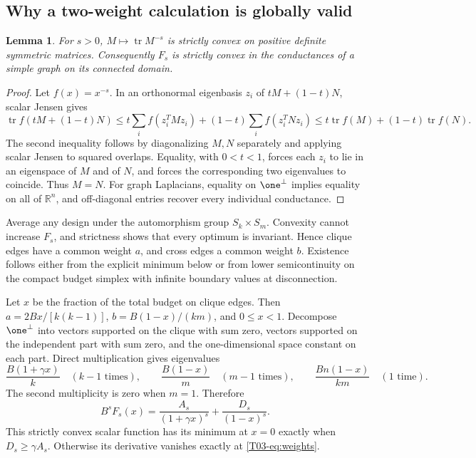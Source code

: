 \documentclass[11pt,a4paper]{article}
\newtheorem{lemma}[theorem]{Lemma}
\theoremstyle{definition}\newtheorem{definition}[theorem]{Definition}
\theoremstyle{remark}\newtheorem{remark}[theorem]{Remark}
\newcommand{\R}{\mathbb R}\newcommand{\C}{\mathbb C}\newcommand{\N}{\mathbb N}
\DeclareMathOperator{\tr}{tr}\DeclareMathOperator{\supp}{supp}\DeclareMathOperator{\TV}{TV}
\numberwithin{equation}{section}
\begin{document}
\subsection{Why a two-weight calculation is globally valid}\label{T03-sec-2}
\begin{lemma}\label{T03-lem:strict}
For $s>0$, $M\mapsto\tr M^{-s}$ is strictly convex on positive definite symmetric matrices. Consequently $F_s$ is strictly convex in the conductances of a simple graph on its connected domain.
\end{lemma}
\begin{proof}
Let $f(x)=x^{-s}$. In an orthonormal eigenbasis $z_i$ of $tM+(1-t)N$, scalar Jensen gives
\[
 \tr f(tM+(1-t)N)\le t\sum_if(z_i^TMz_i)+(1-t)\sum_if(z_i^TNz_i)
 \le t\tr f(M)+(1-t)\tr f(N).
\]
The second inequality follows by diagonalizing $M,N$ separately and applying scalar Jensen to squared overlaps. Equality, with $0<t<1$, forces each $z_i$ to lie in an eigenspace of $M$ and of $N$, and forces the corresponding two eigenvalues to coincide. Thus $M=N$. For graph Laplacians, equality on $\one^\perp$ implies equality on all of $\R^n$, and off-diagonal entries recover every individual conductance.
\end{proof}
Average any design under the automorphism group $S_k\times S_m$. Convexity cannot increase $F_s$, and strictness shows that every optimum is invariant. Hence clique edges have a common weight $a$, and cross edges a common weight $b$. Existence follows either from the explicit minimum below or from lower semicontinuity on the compact budget simplex with infinite boundary values at disconnection.

Let $x$ be the fraction of the total budget on clique edges. Then $a=2Bx/[k(k-1)]$, $b=B(1-x)/(km)$, and $0\le x<1$. Decompose $\one^\perp$ into vectors supported on the clique with sum zero, vectors supported on the independent part with sum zero, and the one-dimensional space constant on each part. Direct multiplication gives eigenvalues
\begin{equation}\label{T03-eq:spectrum}
 \frac{B(1+\gamma x)}k\quad(k-1\text{ times}),\qquad
 \frac{B(1-x)}m\quad(m-1\text{ times}),\qquad
 \frac{Bn(1-x)}{km}\quad(1\text{ time}).
\end{equation}
The second multiplicity is zero when $m=1$. Therefore
\begin{equation}\label{T03-eq:scalar}
 B^sF_s(x)=\frac{A_s}{(1+\gamma x)^s}+\frac{D_s}{(1-x)^s}.
\end{equation}
This strictly convex scalar function has its minimum at $x=0$ exactly when $D_s\ge\gamma A_s$. Otherwise its derivative vanishes exactly at \eqref{T03-eq:weights}.
\end{document}
